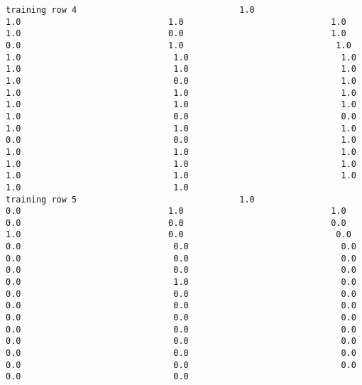 \documentclass[11pt]{article}
\begin{document}
\begin{verbatim}
training row 4                                1.0                             1.0                             1.0                             1.0                             1.0                             0.0                             1.0                             0.0                             1.0                              1.0                              1.0                              1.0                              1.0                              1.0                              1.0                              1.0                              1.0                              0.0                              1.0                              1.0                              1.0                              1.0                              1.0                              1.0                              1.0                              1.0                              0.0                              0.0                              1.0                              1.0                              1.0                              0.0                              0.0                              1.0                              1.0                              1.0                              1.0                              1.0                              1.0                              1.0                              1.0                              1.0                              1.0                              1.0                              1.0
training row 5                                1.0                             0.0                             1.0                             1.0                             0.0                             0.0                             0.0                             1.0                             0.0                              0.0                              0.0                              0.0                              0.0                              0.0                              0.0                              0.0                              0.0                              0.0                              0.0                              0.0                              1.0                              0.0                              0.0                              0.0                              0.0                              0.0                              0.0                              0.0                              0.0                              0.0                              0.0                              0.0                              0.0                              0.0                              0.0                              0.0                              0.0                              0.0                              0.0                              0.0                              0.0                              0.0                              0.0                              0.0                              0.0

\end{verbatim}
\end{document}

